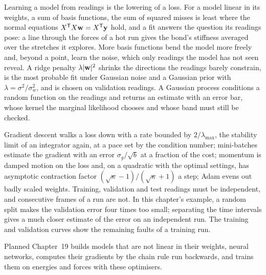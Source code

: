 
Learning a model from readings is the lowering of a loss. For a model
linear in its weights, a sum of basis functions, the sum of squared
misses is least where the normal equations $X^{\mathsf T}X\bm{\mathrm{w}} =
X^{\mathsf T}\bm{\mathrm{y}}$ hold, and a fit answers the question its readings
pose: a line through the forces of a hot run gives the bond's stiffness
averaged over the stretches it explores.
More basis functions bend the
model more freely and, beyond a point, learn the noise, which only
readings the model has not seen reveal. A ridge penalty
$\lambda\lvert\bm{\mathrm{w}}\rvert^2$ shrinks the directions the readings barely
constrain, is the most probable fit under Gaussian noise and a Gaussian
prior with $\lambda = \sigma^2/\sigma_w^2$, and is chosen on validation
readings. A Gaussian process conditions a random function on the
readings and returns an estimate with an error bar, whose kernel the
marginal likelihood chooses and whose band must still be checked.

Gradient descent walks a loss down with a rate bounded by $2/\lambda_{\max}$,
the stability limit of an integrator again, at a pace set by the
condition number; mini-batches estimate the gradient with an error
$\sigma_g/\sqrt b$ at a fraction of the cost; momentum is damped motion
on the loss and, on a quadratic with the optimal settings, has asymptotic
contraction factor $(\sqrt\kappa - 1)/(\sqrt\kappa
+ 1)$ a step; Adam evens out badly scaled weights.
Training, validation
and test readings must be independent, and consecutive frames of a run
are not. In this chapter's example, a random split makes the validation
error four times too small; separating the time intervals gives a much
closer estimate of the error on an independent run. The training and validation curves
show the remaining faults of a training run.

Planned Chapter~19 builds models that are not linear in their weights, neural
networks, computes their gradients by the chain rule run backwards, and
trains them on energies and forces with these optimisers.
